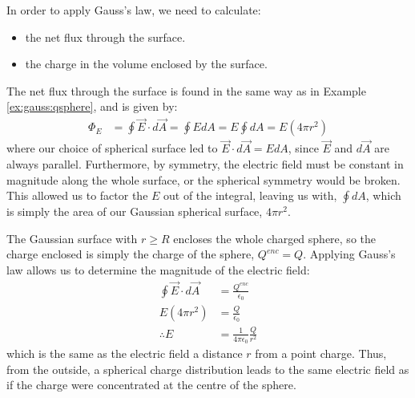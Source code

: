 \begin{example}
In order to apply Gauss's law,  we need to calculate:
\begin{itemize}
\item the net flux through the surface.
\item the charge in the volume enclosed by the surface. 
\end{itemize}
The net flux through the surface is found in the same way as in Example \ref{ex:gauss:qsphere}, and is given by:
\begin{align*}
\Phi_E&=\oint \vec E\cdot d\vec A=\oint E dA= E\oint dA=E(4\pi r^2)
\end{align*}
where our choice of spherical surface led to $\vec E\cdot d\vec A=EdA$, since $\vec E$ and $d\vec A$ are always parallel. Furthermore, by symmetry, the electric field must be constant in magnitude along the whole surface, or the spherical symmetry would be broken. This allowed us to factor the $E$ out of the integral, leaving us with, $\oint dA$, which is simply the area of our Gaussian spherical surface, $4\pi r^2$.

The Gaussian surface with $r\geq R$ encloses the whole charged sphere, so the charge enclosed is simply the charge of the sphere, $Q^{enc}=Q$. Applying Gauss's law allows us to determine the magnitude of the electric field:
\begin{align*}
\oint \vec E\cdot d\vec A&=\frac{Q^{enc}}{\epsilon_0} \\
E(4\pi r^2) &= \frac{Q}{\epsilon_0}\\
\therefore E&= \frac{1}{4\pi\epsilon_0}\frac{Q}{r^2}
\end{align*}
which is the same as the electric field a distance $r$ from a point charge. Thus, from the outside, a spherical charge distribution leads to the same electric field as if the charge were concentrated at the centre of the sphere.


\end{example}
